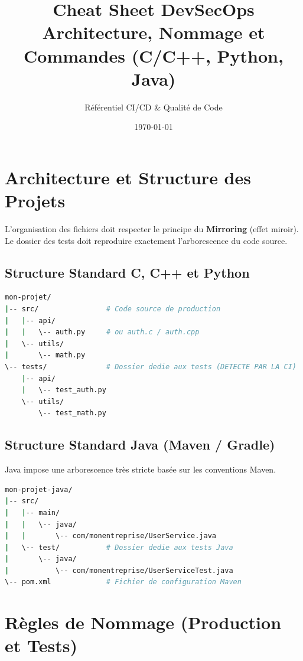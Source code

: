 \documentclass[11pt, a4paper]{report}
\title{\textbf{Cheat Sheet DevSecOps}\\Architecture, Nommage et Commandes (C/C++, Python, Java)}
\author{Référentiel CI/CD \& Qualité de Code}
\date{\today}
\begin{document}
\maketitle
\tableofcontents
\newpage

\chapter{Architecture et Structure des Projets}
L'organisation des fichiers doit respecter le principe du \textbf{Mirroring} (effet miroir). Le dossier des tests doit reproduire exactement l'arborescence du code source.

\section{Structure Standard C, C++ et Python}

\begin{lstlisting}[language=bash, numbers=none]
mon-projet/
|-- src/                # Code source de production
|   |-- api/
|   |   \-- auth.py     # ou auth.c / auth.cpp
|   \-- utils/
|       \-- math.py
\-- tests/              # Dossier dedie aux tests (DETECTE PAR LA CI)
    |-- api/
    |   \-- test_auth.py
    \-- utils/
        \-- test_math.py
\end{lstlisting}

\section{Structure Standard Java (Maven / Gradle)}
Java impose une arborescence très stricte basée sur les conventions Maven.

\begin{lstlisting}[language=bash, numbers=none]
mon-projet-java/
|-- src/
|   |-- main/
|   |   \-- java/
|   |       \-- com/monentreprise/UserService.java
|   \-- test/           # Dossier dedie aux tests Java
|       \-- java/
|           \-- com/monentreprise/UserServiceTest.java
\-- pom.xml             # Fichier de configuration Maven
\end{lstlisting}

\chapter{Règles de Nommage (Production et Tests)}
\end{document}
